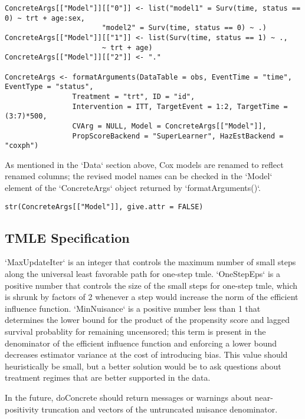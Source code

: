\documentclass{report}
\newcommand{\1}{\ensuremath{\mathbf{1}}}
\begin{document}
\begin{lstlisting}
ConcreteArgs[["Model"]][["0"]] <- list("model1" = Surv(time, status == 0) ~ trt + age:sex,
				       "model2" = Surv(time, status == 0) ~ .)
ConcreteArgs[["Model"]][["1"]] <- list(Surv(time, status == 1) ~ ., 
				       ~ trt + age)
ConcreteArgs[["Model"]][["2"]] <- "."

ConcreteArgs <- formatArguments(DataTable = obs, EventTime = "time", EventType = "status", 
				Treatment = "trt", ID = "id", 
				Intervention = ITT, TargetEvent = 1:2, TargetTime = (3:7)*500, 
				CVArg = NULL, Model = ConcreteArgs[["Model"]], 
				PropScoreBackend = "SuperLearner", HazEstBackend = "coxph")
\end{lstlisting}

As mentioned in the `Data` section above, Cox models are renamed to reflect renamed columns; the revised model names can be checked in the `Model` element of the `ConcreteArgs` object returned by `formatArguments()`.

\begin{lstlisting}
str(ConcreteArgs[["Model"]], give.attr = FALSE)
\end{lstlisting}

\subsection{TMLE Specification}
`MaxUpdateIter` is an integer that controls the maximum number of small steps along the universal least favorable path for one-step tmle. `OneStepEps` is a positive number that controls the size of the small steps for one-step tmle, which is shrunk by factors of 2 whenever a step would increase the norm of the efficient influence function. `MinNuisance` is a positive number less than 1 that determines the lower bound for the product of the propensity score and lagged survival probablity for remaining uncensored; this term is present in the denominator of the efficient influence function and enforcing a lower bound decreases estimator variance at the cost of introducing bias. This value should heuristically be small, but a better solution would be to ask questions about treatment regimes that are better supported in the data.

In the future, doConcrete should return messages or warnings about near-positivity truncation and vectors of the untruncated nuisance denominator.
\end{document}
